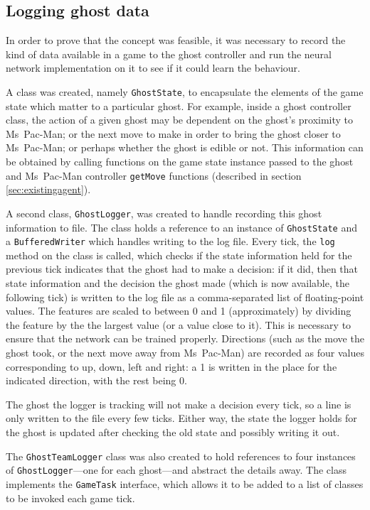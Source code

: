 \subsection{Logging ghost data}
\label{sec:logging}

In order to prove that the concept was feasible, it was necessary to record the kind of data available in a game to the ghost controller and run the neural network implementation on it to see if it could learn the behaviour.

A class was created, namely {\tt GhostState}, to encapsulate the elements of the game state which matter to a particular ghost.  For example, inside a ghost controller class, the action of a given ghost may be dependent on the ghost's proximity to Ms~Pac-Man; or the next move to make in order to bring the ghost closer to Ms~Pac-Man; or perhaps whether the ghost is edible or not.  This information can be obtained by calling functions on the game state instance passed to the ghost and Ms~Pac-Man controller {\tt getMove} functions (described in section \ref{sec:existingagent}).

A second class, {\tt GhostLogger}, was created to handle recording this ghost information to file. The class holds a reference to an instance of {\tt GhostState} and a {\tt BufferedWriter} which handles writing to the log file.  Every tick, the {\tt log} method on the class is called, which checks if the state information held for the previous tick indicates that the ghost had to make a decision: if it did, then that state information and the decision the ghost made (which is now available, the following tick) is written to the log file as a comma-separated list of floating-point values.  The features are scaled to between 0 and 1 (approximately) by dividing the feature by the the largest value (or a value close to it).  This is necessary to ensure that the network can be trained properly.  Directions (such as the move the ghost took, or the next move away from Ms~Pac-Man) are recorded as four values corresponding to up, down, left and right: a 1 is written in the place for the indicated direction, with the rest being 0.

The ghost the logger is tracking will not make a decision every tick, so a line is only written to the file every few ticks.  Either way, the state the logger holds for the ghost is updated after checking the old state and possibly writing it out.

The {\tt GhostTeamLogger} class was also created to hold references to four instances of {\tt GhostLogger}---one for each ghost---and abstract the details away.  The class implements the {\tt GameTask} interface, which allows it to be added to a list of classes to be invoked each game tick.

